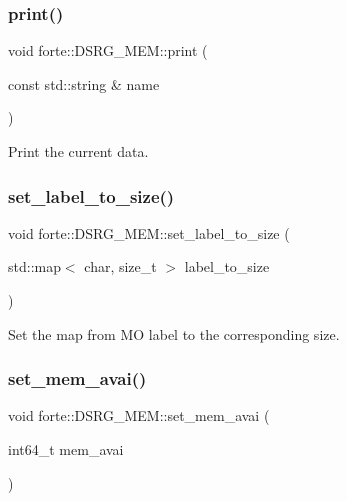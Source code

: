 \subsubsection{\texorpdfstring{print()}{print()}}
{\footnotesize\ttfamily void forte\+::\+D\+S\+R\+G\+\_\+\+M\+E\+M\+::print (\begin{DoxyParamCaption}\item[{const std\+::string \&}]{name }\end{DoxyParamCaption})}



Print the current data. 

\mbox{\label{classforte_1_1_d_s_r_g___m_e_m_a6f9be312b939223601bbc870700a5b49}} 
\subsubsection{\texorpdfstring{set\+\_\+label\+\_\+to\+\_\+size()}{set\_label\_to\_size()}}
{\footnotesize\ttfamily void forte\+::\+D\+S\+R\+G\+\_\+\+M\+E\+M\+::set\+\_\+label\+\_\+to\+\_\+size (\begin{DoxyParamCaption}\item[{std\+::map$<$ char, size\+\_\+t $>$}]{label\+\_\+to\+\_\+size }\end{DoxyParamCaption})\hspace{0.3cm}{\ttfamily [inline]}}



Set the map from MO label to the corresponding size. 

\mbox{\label{classforte_1_1_d_s_r_g___m_e_m_a6385e6f596c51a495f537672f6c86b4e}} 
\subsubsection{\texorpdfstring{set\+\_\+mem\+\_\+avai()}{set\_mem\_avai()}}
{\footnotesize\ttfamily void forte\+::\+D\+S\+R\+G\+\_\+\+M\+E\+M\+::set\+\_\+mem\+\_\+avai (\begin{DoxyParamCaption}\item[{int64\+\_\+t}]{mem\+\_\+avai }\end{DoxyParamCaption})\hspace{0.3cm}{\ttfamily [inline]}}



